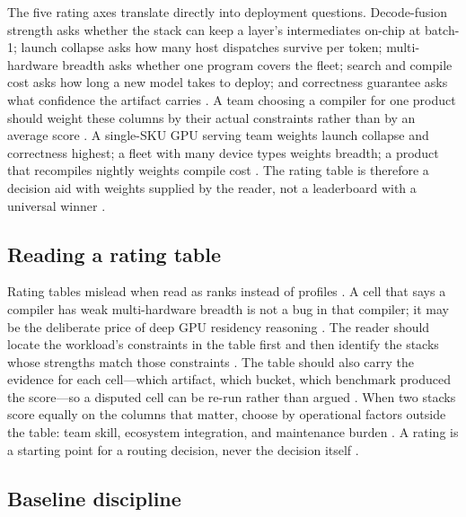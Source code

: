 The five rating axes translate directly into deployment questions. Decode-fusion strength asks whether the stack can keep a layer's intermediates on-chip at batch-1; launch collapse asks how many host dispatches survive per token; multi-hardware breadth asks whether one program covers the fleet; search and compile cost asks how long a new model takes to deploy; and correctness guarantee asks what confidence the artifact carries \citep{patel2025llminference,memoryfloor2026,taxbreak2026}. A team choosing a compiler for one product should weight these columns by their actual constraints rather than by an average score \citep{chen2020compilerbasedhardw,patel2025llminference}. A single-SKU GPU serving team weights launch collapse and correctness highest; a fleet with many device types weights breadth; a product that recompiles nightly weights compile cost \citep{kwon2023vllm,patel2025llminference}. The rating table is therefore a decision aid with weights supplied by the reader, not a leaderboard with a universal winner \citep{taxbreak2026,memoryfloor2026}.

\subsection{Reading a rating table}

Rating tables mislead when read as ranks instead of profiles \citep{patel2025llminference,memoryfloor2026}. A cell that says a compiler has weak multi-hardware breadth is not a bug in that compiler; it may be the deliberate price of deep GPU residency reasoning \citep{tritonlang2024,wu2024mirage}. The reader should locate the workload's constraints in the table first and then identify the stacks whose strengths match those constraints \citep{chen2020compilerbasedhardw,taxbreak2026}. The table should also carry the evidence for each cell---which artifact, which bucket, which benchmark produced the score---so a disputed cell can be re-run rather than argued \citep{patel2025llminference,memoryfloor2026}. When two stacks score equally on the columns that matter, choose by operational factors outside the table: team skill, ecosystem integration, and maintenance burden \citep{chen2020compilerbasedhardw,patel2025llminference}. A rating is a starting point for a routing decision, never the decision itself \citep{taxbreak2026,memoryfloor2026}.

\subsection{Baseline discipline}

